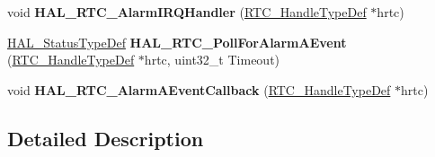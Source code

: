 \begin{DoxyCompactItemize}
\item 
void {\bfseries H\+A\+L\+\_\+\+R\+T\+C\+\_\+\+Alarm\+I\+R\+Q\+Handler} (\hyperlink{struct_r_t_c___handle_type_def}{R\+T\+C\+\_\+\+Handle\+Type\+Def} $\ast$hrtc)\hypertarget{group___r_t_c___exported___functions___group3_gac185f2ce34fe566418d0978a48e0c199}{}\label{group___r_t_c___exported___functions___group3_gac185f2ce34fe566418d0978a48e0c199}

\item 
\hyperlink{stm32f4xx__hal__def_8h_a63c0679d1cb8b8c684fbb0632743478f}{H\+A\+L\+\_\+\+Status\+Type\+Def} {\bfseries H\+A\+L\+\_\+\+R\+T\+C\+\_\+\+Poll\+For\+Alarm\+A\+Event} (\hyperlink{struct_r_t_c___handle_type_def}{R\+T\+C\+\_\+\+Handle\+Type\+Def} $\ast$hrtc, uint32\+\_\+t Timeout)\hypertarget{group___r_t_c___exported___functions___group3_gaedc27fe412f45d999d74a0b98dce4d09}{}\label{group___r_t_c___exported___functions___group3_gaedc27fe412f45d999d74a0b98dce4d09}

\item 
void {\bfseries H\+A\+L\+\_\+\+R\+T\+C\+\_\+\+Alarm\+A\+Event\+Callback} (\hyperlink{struct_r_t_c___handle_type_def}{R\+T\+C\+\_\+\+Handle\+Type\+Def} $\ast$hrtc)\hypertarget{group___r_t_c___exported___functions___group3_ga11aeff83fd498cddbed3bcddcf017e0a}{}\label{group___r_t_c___exported___functions___group3_ga11aeff83fd498cddbed3bcddcf017e0a}

\end{DoxyCompactItemize}


\subsection{Detailed Description}
